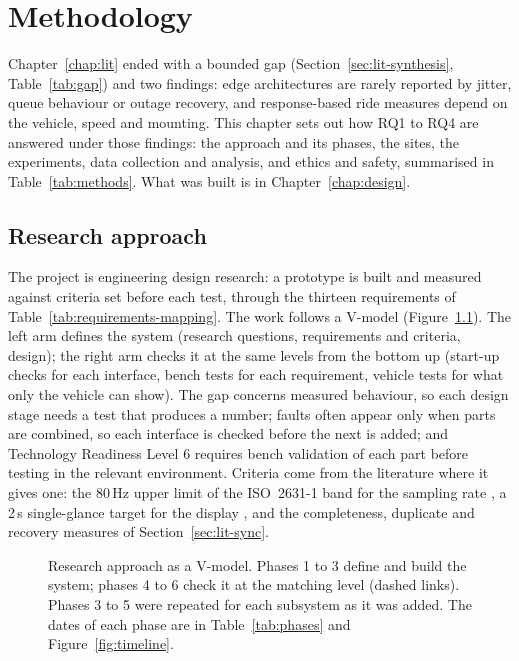 \chapter{Methodology}
\label{chap:method}

Chapter~\ref{chap:lit} ended with a bounded gap (Section~\ref{sec:lit-synthesis}, Table~\ref{tab:gap}) and two findings: edge architectures are rarely reported by jitter, queue behaviour or outage recovery, and response-based ride measures depend on the vehicle, speed and mounting. This chapter sets out how RQ1 to RQ4 are answered under those findings: the approach and its phases, the sites, the experiments, data collection and analysis, and ethics and safety, summarised in Table~\ref{tab:methods}. What was built is in Chapter~\ref{chap:design}.

\section{Research approach}
\label{sec:approach}

The project is engineering design research: a prototype is built and measured against criteria set before each test, through the thirteen requirements of Table~\ref{tab:requirements-mapping}. The work follows a V-model (Figure~\ref{fig:vmodel}). The left arm defines the system (research questions, requirements and criteria, design); the right arm checks it at the same levels from the bottom up (start-up checks for each interface, bench tests for each requirement, vehicle tests for what only the vehicle can show). The gap concerns measured behaviour, so each design stage needs a test that produces a number; faults often appear only when parts are combined, so each interface is checked before the next is added; and Technology Readiness Level 6 \cite{kimmel2020} requires bench validation of each part before testing in the relevant environment. Criteria come from the literature where it gives one: the 80\,Hz upper limit of the ISO~2631-1 band for the sampling rate \cite{iso2631}, a 2\,s single-glance target for the display \cite{nhtsa2013}, and the completeness, duplicate and recovery measures of Section~\ref{sec:lit-sync}.

\begin{figure}[htbp]
\centering

\caption[Research approach as a V-model]{Research approach as a V-model. Phases 1 to 3 define and build the system; phases 4 to 6 check it at the matching level (dashed links). Phases 3 to 5 were repeated for each subsystem as it was added. The dates of each phase are in Table~\ref{tab:phases} and Figure~\ref{fig:timeline}.}
\label{fig:vmodel}
\end{figure}

